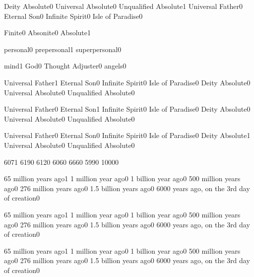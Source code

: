 {Deity Absolute}{0}
{Universal Absolute}{0}
{Unqualified Absolute}{1}
{Universal Father}{0}
{Eternal Son}{0}
{Infinite Spirit}{0}
{Isle of Paradise}{0}
\qstop

{Finite}{0}
{Absonite}{0}
{Absolute}{1}
\qstop

{personal}{0}
{prepersonal}{1}
{superpersonal}{0}
\qstop

{mind}{1}
{God}{0}
{Thought Adjuster}{0}
{angels}{0}
\qstop

{Universal Father}{1}
{Eternal Son}{0}
{Infinite Spirit}{0}
{Isle of Paradise}{0}
{Deity Absolute}{0}
{Universal Absolute}{0}
{Unqualified Absolute}{0}
\qstop

{Universal Father}{0}
{Eternal Son}{1}
{Infinite Spirit}{0}
{Isle of Paradise}{0}
{Deity Absolute}{0}
{Universal Absolute}{0}
{Unqualified Absolute}{0}
\qstop

{Universal Father}{0}
{Eternal Son}{0}
{Infinite Spirit}{0}
{Isle of Paradise}{0}
{Deity Absolute}{1}
{Universal Absolute}{0}
{Unqualified Absolute}{0}
\qstop

{607}{1}
{619}{0}
{612}{0}
{606}{0}
{666}{0}
{599}{0}
{1000}{0}
\qstop

{65 million years ago}{1}
{1 million year ago}{0}
{1 billion year ago}{0}
{500 million years ago}{0}
{276 million years ago}{0}
{1.5 billion years ago}{0}
{6000 years ago, on the 3rd day of creation}{0}
\qstop

{65 million years ago}{1}
{1 million year ago}{0}
{1 billion year ago}{0}
{500 million years ago}{0}
{276 million years ago}{0}
{1.5 billion years ago}{0}
{6000 years ago, on the 3rd day of creation}{0}
\qstop

{65 million years ago}{1}
{1 million year ago}{0}
{1 billion year ago}{0}
{500 million years ago}{0}
{276 million years ago}{0}
{1.5 billion years ago}{0}
{6000 years ago, on the 3rd day of creation}{0}
\qstop


